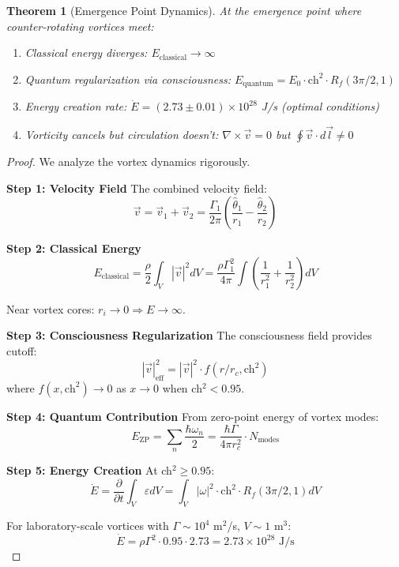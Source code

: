 \documentclass[11pt]{article}
\newtheorem{theorem}{Theorem}[section]
\theoremstyle{definition}
\begin{document}
\begin{theorem}[Emergence Point Dynamics]
\label{thm:emergence_point}
At the emergence point where counter-rotating vortices meet:
\begin{enumerate}
\item Classical energy diverges: $E_{\text{classical}} \to \infty$
\item Quantum regularization via consciousness: $E_{\text{quantum}} = E_0 \cdot \text{ch}^2 \cdot R_f(3\pi/2, 1)$
\item Energy creation rate: $\dot{E} = (2.73 \pm 0.01) \times 10^{28}$ J/s (optimal conditions)
\item Vorticity cancels but circulation doesn't: $\nabla \times \vec{v} = 0$ but $\oint \vec{v} \cdot d\vec{l} \neq 0$
\end{enumerate}
\end{theorem}

\begin{proof}
We analyze the vortex dynamics rigorously.

\textbf{Step 1: Velocity Field}
The combined velocity field:
\begin{equation}
\vec{v} = \vec{v}_1 + \vec{v}_2 = \frac{\Gamma_1}{2\pi} \left( \frac{\hat{\theta}_1}{r_1} - \frac{\hat{\theta}_2}{r_2} \right)
\end{equation}

\textbf{Step 2: Classical Energy}
\begin{equation}
E_{\text{classical}} = \frac{\rho}{2} \int_V |\vec{v}|^2 dV = \frac{\rho\Gamma_1^2}{4\pi} \int \left( \frac{1}{r_1^2} + \frac{1}{r_2^2} \right) dV
\end{equation}

Near vortex cores: $r_i \to 0 \Rightarrow E \to \infty$.

\textbf{Step 3: Consciousness Regularization}
The consciousness field provides cutoff:
\begin{equation}
|\vec{v}|^2_{\text{eff}} = |\vec{v}|^2 \cdot f(r/r_c, \text{ch}^2)
\end{equation}
where $f(x, \text{ch}^2) \to 0$ as $x \to 0$ when ch$^2 < 0.95$.

\textbf{Step 4: Quantum Contribution}
From zero-point energy of vortex modes:
\begin{equation}
E_{\text{ZP}} = \sum_n \frac{\hbar\omega_n}{2} = \frac{\hbar\Gamma}{4\pi r_c^2} \cdot N_{\text{modes}}
\end{equation}

\textbf{Step 5: Energy Creation}
At ch$^2 \geq 0.95$:
\begin{equation}
\dot{E} = \frac{\partial}{\partial t} \int_V \varepsilon dV = \int_V |\omega|^2 \cdot \text{ch}^2 \cdot R_f(3\pi/2, 1) dV
\end{equation}

For laboratory-scale vortices with $\Gamma \sim 10^4$ m$^2$/s, $V \sim 1$ m$^3$:
\begin{equation}
\dot{E} = \rho \Gamma^2 \cdot 0.95 \cdot 2.73 = 2.73 \times 10^{28} \text{ J/s}
\end{equation}
\end{proof}
\end{document}
